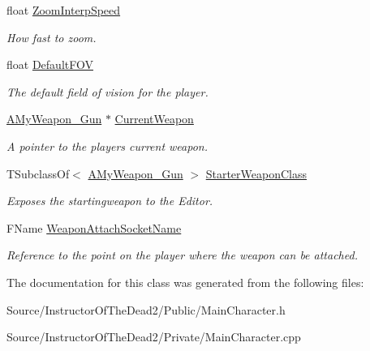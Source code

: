 \begin{DoxyCompactItemize}
float \mbox{\hyperlink{class_a_main_character_acb71d1fee43be1c94560bc6f427bdc3f}{Zoom\+Interp\+Speed}}
\begin{DoxyCompactList}\small\item\em How fast to zoom. \end{DoxyCompactList}\item 
\mbox{\label{class_a_main_character_aff0b6ec995a455073f0f4bb50cb15624}} 
float \mbox{\hyperlink{class_a_main_character_aff0b6ec995a455073f0f4bb50cb15624}{Default\+F\+OV}}
\begin{DoxyCompactList}\small\item\em The default field of vision for the player. \end{DoxyCompactList}\item 
\mbox{\label{class_a_main_character_a564bee74c5e98baec0d48df92b73fd26}} 
\mbox{\hyperlink{class_a_my_weapon___gun}{A\+My\+Weapon\+\_\+\+Gun}} $\ast$ \mbox{\hyperlink{class_a_main_character_a564bee74c5e98baec0d48df92b73fd26}{Current\+Weapon}}
\begin{DoxyCompactList}\small\item\em A pointer to the players current weapon. \end{DoxyCompactList}\item 
\mbox{\label{class_a_main_character_ab4701b65e5eaf3217ef385962c081620}} 
T\+Subclass\+Of$<$ \mbox{\hyperlink{class_a_my_weapon___gun}{A\+My\+Weapon\+\_\+\+Gun}} $>$ \mbox{\hyperlink{class_a_main_character_ab4701b65e5eaf3217ef385962c081620}{Starter\+Weapon\+Class}}
\begin{DoxyCompactList}\small\item\em Exposes the startingweapon to the Editor. \end{DoxyCompactList}\item 
\mbox{\label{class_a_main_character_a661bb8f07ac38949071c5683b0d33251}} 
F\+Name \mbox{\hyperlink{class_a_main_character_a661bb8f07ac38949071c5683b0d33251}{Weapon\+Attach\+Socket\+Name}}
\begin{DoxyCompactList}\small\item\em Reference to the point on the player where the weapon can be attached. \end{DoxyCompactList}\end{DoxyCompactItemize}


The documentation for this class was generated from the following files\+:\begin{DoxyCompactItemize}
\item 
Source/\+Instructor\+Of\+The\+Dead2/\+Public/Main\+Character.\+h\item 
Source/\+Instructor\+Of\+The\+Dead2/\+Private/Main\+Character.\+cpp\end{DoxyCompactItemize}
